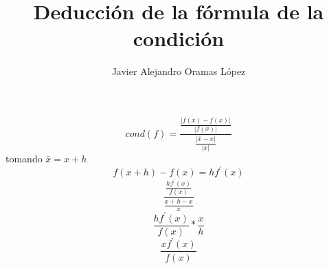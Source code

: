 \documentclass{article}
\title{Deducción de la fórmula de la condición}
\author{Javier Alejandro Oramas López}
\date{}
\begin{document}
    \maketitle
    \[ cond(f) =  \frac{\frac{|f(\bar{x}) - f(x)|}{|f(x)|}}{\frac{|\bar{x}-x|}{|x|}} \]
    tomando $ \bar{x} = x+h $
    \[  f(x+h) - f(x) = hf^{'}(x)\]
    \[ \frac{\frac{hf^{'}(x)}{f(x)}}{\frac{x+h-x}{x}} \]
    \[ \frac{hf^{'}(x)}{f(x)}*\frac{x}{h} \]
    \[ \frac{xf^{'}(x)}{f(x)} \]
\end{document}
